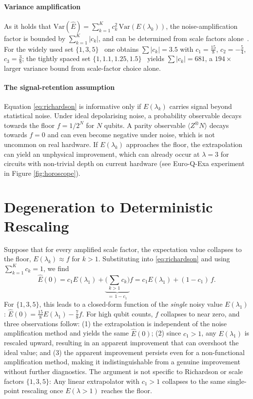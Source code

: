 \documentclass[10pt,conference, letterpaper]{IEEEtran}
\begin{document}
\paragraph{Variance amplification}
As it holds that $\mathrm{Var}(\hat{E}) = \sum_{k=1}^K c_k^2\, \mathrm{Var}(E(\lambda_k))$, the noise-amplification factor is bounded by $\sum_{k=1}^K |c_k|$,  and can be determined from 
scale factors
alone~\cite{cai_quantum_2023,krebsbach_optimization_2022}. For the
widely used set $\{1,3,5\}$~\cite{giurgica-tiron_digital_2020,majumdar_best_2023}
one obtains $\sum|c_k|=3.5$ with $c_1=\tfrac{15}{8}$, $c_2=-\tfrac{5}{4}$,
$c_3=\tfrac{3}{8}$; the tightly spaced set $\{1,1.1,1.25,1.5\}$~\cite{kandala_error_2019} yields
$\sum|c_k|=681$, a $194\times$ larger variance bound from scale-factor choice
alone.

\paragraph{The signal-retention assumption}
Equation \eqref{eq:richardson} is informative only if $E(\lambda_k)$ carries signal beyond statistical noise. Under ideal depolarising noise, a probability observable decays towards the floor $f = 1/2^N$ for $N$ qubits. A parity observable $\langle Z^\otimes N \rangle$ decays towards $f=0$ and can even become negative under noise, which is not uncommon on real hardware. If $E(\lambda_k)$ approaches the floor, the extrapolation can yield an unphysical improvement, which can already occur at $\lambda=3$ for circuits with non-trivial depth on current hardware (see Euro-Q-Exa experiment in Figure \ref{fig:horoscope}).

\section{Degeneration to Deterministic Rescaling}
\label{sec:degeneration}
Suppose that for every amplified scale factor, the expectation value collapses to the floor, $E(\lambda_k)\approx f$ for $k>1$. Substituting into
\eqref{eq:richardson} and using $\sum_{k=1}^K c_k=1$, we find
%
\begin{equation}
  \hat{E}(0)=c_1E(\lambda_1)+\underbrace{\Big(\textstyle\sum_{k>1}c_k\Big)}_{=\,1-c_1}f
            =c_1E(\lambda_1)+(1-c_1)\,f.
  \label{eq:deterministic}
\end{equation}
%
For $\{1,3,5\}$, this leads to a closed-form function of the \emph{single} noisy value $E(\lambda_1)$: $\hat{E}(0)=\tfrac{15}{8}E(\lambda_1)-\tfrac{7}{8}f$. For high qubit counts, $f$ collapses to near zero, and three observations follow: (1) the extrapolation is independent of the noise amplification method and yields the same $\hat{E}(0)$; (2) since $c_1>1$, any $E(\lambda_1)$ is rescaled upward, resulting in an apparent improvement that can overshoot the ideal value; and (3) the apparent improvement persists even for a non-functional amplification method, making it indistinguishable from a genuine improvement without further diagnostics. The argument is not specific to Richardson or scale factors $\{1,3,5\}$: Any linear extrapolator with $c_1>1$ collapses to the same single-point rescaling once $E(\lambda{>}1)$ reaches the floor.
\end{document}
